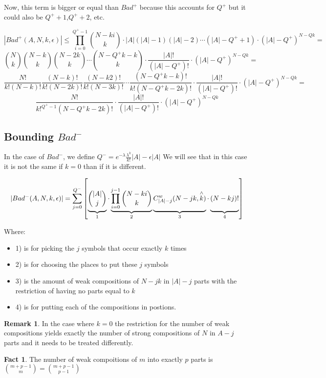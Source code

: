 \documentclass[10pt, a4paper]{article}
\theoremstyle{definition}
\newtheorem{remark}{Remark}
\newtheorem{fact}{Fact}
\begin{document}
Now, this term is bigger or equal than $Bad^+$ because this accounts for $Q^+$ but it could also be $Q^+ + 1$,$Q^+ + 2$, etc.

$$|Bad^+(A,N,k,\epsilon)| \leq  \prod_{i=0}^{Q^+ -1} \binom{N-ki}{k} \cdot |A|(|A| - 1)(|A| - 2)\cdots(|A| - Q^+ + 1) \cdot (|A|-Q^+)^{N-Qk} = $$
$$\binom{N}{k}\binom{N-k}{k}\binom{N-2k}{k}\cdots \binom{N-Q^+k-k}{k} \cdot \frac{|A|!}{(|A| - Q^+)!} \cdot (|A|-Q^+)^{N-Qk} =$$
$$\frac{N!}{k!(N-k)!}\frac{(N-k)!}{k!(N-2k)!}\frac{(N-k2)!}{k!(N-3k)!} \cdots \frac{(N-Q^+k-k)!}{k!(N-Q^+k-2k)!} \cdot \frac{|A|!}{(|A| - Q^+)!} \cdot (|A|-Q^+)^{N-Qk} = $$
$$\frac{N!}{k!^{Q^+-1} (N-Q^+k-2k)!} \cdot \frac{|A|!}{(|A| - Q^+)!} \cdot (|A|-Q^+)^{N-Qk}$$

\subsection{Bounding $Bad^-$}

In the case of $Bad^-$, we define $Q^- = e^{-\lambda}\frac{\lambda^{k}}{k!}|A| - \epsilon|A|$ We will see that in this case it is not the same if $k = 0$ than if it is different.

$$|Bad^-(A,N,k,\epsilon)| = \sum_{j=0}^{Q^-} \left[ \underbrace{ \vphantom{ \prod_{i=0}^{j-1 }} \binom{|A|}{j}}_1 \cdot \underbrace{\prod_{i=0}^{j-1} \binom{N - ki}{k}}_2 \underbrace{\vphantom{ \prod_{i=0}^{j-1 }} C^w_{|A|-j}(N-jk,\overset{\wedge}k)}_3 \cdot \underbrace{\vphantom{ \prod_{i=0}^{j-1 }} (N - kj)!}_4\right] $$



Where:
\begin{itemize}
  \item 1) is for picking the $j$ symbols that occur exactly $k$ times
  \item 2) is for choosing the places to put these $j$ symbols
  \item 3) is the amount of weak compositions of $N-jk$ in $|A|-j$ parts with the restriction of having no parts equal to $k$
  \item 4) is for putting each of the compositions in postions.
\end{itemize}

\begin{remark}
  In the case where $k = 0$ the restriction for the number of weak compositions yields exactly the number of strong compositions of $N$ in $A-j$ parts and it needs to be treated differently.
\end{remark}

\begin{fact}
  The number of weak compoitions of $m$ into exactly $p$ parts is $\binom{m+p-1}{m} = \binom{m+p-1}{p-1}$
\end{fact}
\end{document}
